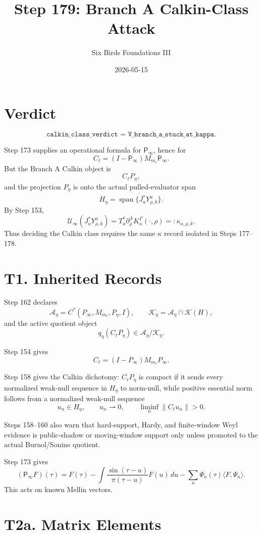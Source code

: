 \documentclass[11pt]{article}
\title{Step 179: Branch A Calkin-Class Attack}
\author{Six Birds Foundations III}
\date{2026-05-15}
\newcommand{\Psym}{\mathsf P_\infty}
\newcommand{\Cell}{C_\ell}
\newcommand{\Peta}{P_\eta}
\newcommand{\Keta}{\mathcal K_\eta}
\newcommand{\Aeta}{\mathcal A_\eta}
\begin{document}
\maketitle

\section{Verdict}

\[
\boxed{\texttt{calkin\_class\_verdict = V\_branch\_a\_stuck\_at\_kappa}.}
\]

Step 173 supplies an operational formula for \(\Psym\), hence for
\[
\Cell=(I-\Psym)M_{m_\ell}\Psym.
\]
But the Branch A Calkin object is
\[
\Cell\Peta,
\]
and the projection \(\Peta\) is onto the actual pulled-evaluator span
\[
H_\eta=\overline{\operatorname{span}\{J_a^*Y^a_{\rho,k}\}}.
\]
By Step 153,
\[
\mathcal U_\infty(J_a^*Y^a_{\rho,k})
=
T_a^*\partial_{\overline\rho}^{\,k}K_a^\Gamma(\cdot,\rho)
=:\kappa_{a,\rho,k}.
\]
Thus deciding the Calkin class requires the same \(\kappa\) record isolated in
Steps 177--178.

\section{T1. Inherited Records}

Step 162 declares
\[
\Aeta=C^*(P_\infty,M_{m_\ell},P_\eta,I),
\qquad
\Keta=\Aeta\cap\mathcal K(H),
\]
and the active quotient object
\[
q_\eta(\Cell\Peta)\in\Aeta/\Keta.
\]

Step 154 gives
\[
\Cell=(I-P_\infty)M_{m_\ell}P_\infty.
\]

Step 158 gives the Calkin dichotomy: \(\Cell\Peta\) is compact if it sends
every normalized weak-null sequence in \(H_\eta\) to norm-null, while positive
essential norm follows from a normalized weak-null sequence
\[
u_n\in H_\eta,\qquad u_n\rightharpoonup0,\qquad
\liminf_n\|\Cell u_n\|>0.
\]

Steps 158--160 also warn that hard-support, Hardy, and finite-window Weyl
evidence is public-shadow or moving-window support only unless promoted to the
actual Burnol/Sonine quotient.

Step 173 gives
\[
(\Psym F)(\tau)
=F(\tau)-\int\frac{\sin(\tau-u)}{\pi(\tau-u)}F(u)\,du
-\sum_n\Psi_n(\tau)\langle F,\Psi_n\rangle.
\]
This acts on known Mellin vectors.

\section{T2a. Matrix Elements}
\end{document}
